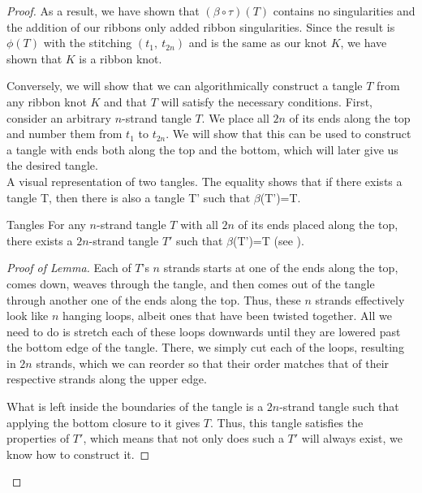 \begin{paper}
\begin{proof}
As a result, we have shown that $(\beta\circ\tau)(T)$ contains no singularities
and the addition of our ribbons only added ribbon singularities.
Since the result is $\phi(T)$ with the stitching $(t_1,~t_{2n})$ and is the same
as our knot $K$, we have shown that $K$ is a ribbon knot.

Conversely, we will show that we can algorithmically construct a tangle $T$ from
any ribbon knot $K$ and that $T$ will satisfy the necessary conditions.
First, consider an arbitrary $n$-strand tangle $T$.
We place all $2n$ of its ends along the top and number them from $t_1$ to
$t_{2n}$.
We will show that this can be used to construct a tangle with ends both along
the top and the bottom, which will later give us the desired tangle.\\

{A visual representation of two tangles.
The equality shows that if there exists a tangle T, then there is also a tangle
T' such that $\beta$(T')=T.}

\begin{paperlem}{Tangles}
For any $n$-strand tangle $T$ with all $2n$ of its ends placed along the top,
there exists a $2n$-strand tangle $T'$ such that $\beta$(T')=T (see \figLemma).
\end{paperlem}
\begin{proof}[Proof of Lemma]
Each of $T$'s $n$ strands starts at one of the ends along the top, comes down,
weaves through the tangle, and then comes out of the tangle through another one
of the ends along the top.
Thus, these $n$ strands effectively look like $n$ hanging loops, albeit ones
that have been twisted together.
All we need to do is stretch each of these loops downwards until they are
lowered past the bottom edge of the tangle.
There, we simply cut each of the loops, resulting in $2n$ strands, which we can
reorder so that their order matches that of their respective strands along the
upper edge.

What is left inside the boundaries of the tangle is a $2n$-strand tangle such
that applying the bottom closure to it gives $T$.
Thus, this tangle satisfies the properties of $T'$, which means that not only
does such a $T'$ will always exist, we know how to construct it.
\end{proof}


\end{proof}
\end{paper}
